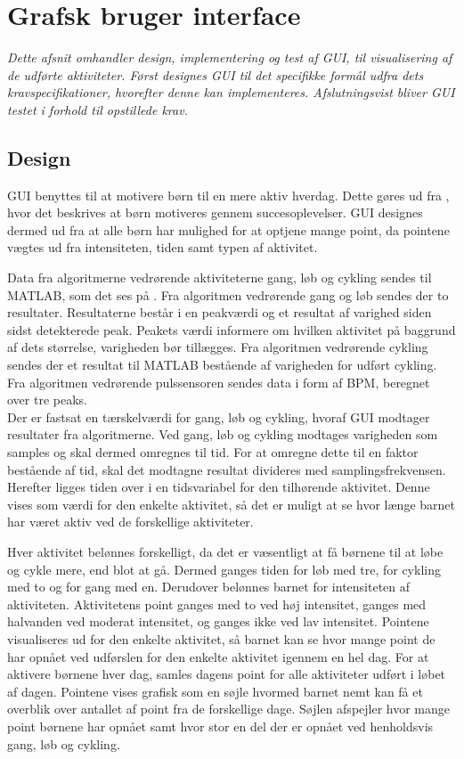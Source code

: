 \section{Grafsk bruger interface}
\textit{Dette afsnit omhandler design, implementering og test af GUI, til visualisering af de udførte aktiviteter. Først designes GUI til det specifikke formål udfra dets kravspecifikationer, hvorefter denne kan implementeres. Afslutningsvist bliver GUI testet i forhold til opstillede krav.}
\subsection{Design}
GUI benyttes til at motivere børn til en mere aktiv hverdag. Dette gøres ud fra , hvor det beskrives at børn motiveres gennem succesoplevelser. GUI designes dermed ud fra at alle børn har mulighed for at optjene mange point, da pointene vægtes ud fra intensiteten, tiden samt typen af aktivitet.

Data fra algoritmerne vedrørende aktiviteterne gang, løb og cykling sendes til MATLAB, som det ses på . Fra algoritmen vedrørende gang og løb sendes der to resultater. Resultaterne består i en peakværdi og et resultat af varighed siden sidst detekterede peak. Peakets værdi informere om hvilken aktivitet på baggrund af dets størrelse, varigheden bør tillægges. Fra algoritmen vedrørende cykling sendes der et resultat til MATLAB bestående af varigheden for udført cykling. Fra algoritmen vedrørende pulssensoren sendes data i form af BPM, beregnet over tre peaks. \\
Der er fastsat en tærskelværdi for gang, løb og cykling, hvoraf GUI modtager resultater fra algoritmerne. Ved gang, løb og cykling modtages varigheden som samples og skal dermed omregnes til tid. For at omregne dette til en faktor bestående af tid, skal det modtagne resultat divideres med samplingsfrekvensen. Herefter ligges tiden over i en tidsvariabel for den tilhørende aktivitet. Denne vises som værdi for den enkelte aktivitet, så det er muligt at se hvor længe barnet har været aktiv ved de forskellige aktiviteter.

Hver aktivitet belønnes forskelligt, da det er væsentligt at få børnene til at løbe og cykle mere, end blot at gå. Dermed ganges tiden for løb med tre, for cykling med to og for gang med en. Derudover belønnes barnet for intensiteten af aktiviteten. Aktivitetens point ganges med to ved høj intensitet, ganges med halvanden ved moderat intensitet, og ganges ikke ved lav intensitet. Pointene visualiseres ud for den enkelte aktivitet, så barnet kan se hvor mange point de har opnået ved udførslen for den enkelte aktivitet igennem en hel dag. For at aktivere børnene hver dag, samles dagens point for alle aktiviteter udført i løbet af dagen. Pointene vises grafisk som en søjle hvormed barnet nemt kan få et overblik over antallet af point fra de forskellige dage. Søjlen afspejler hvor mange point børnene har opnået samt hvor stor en del der er opnået ved henholdsvis gang, løb og cykling.  

